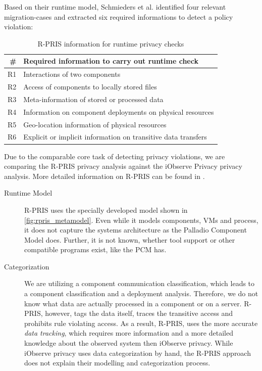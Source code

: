 Based on their runtime model, Schmieders et al. identified four relevant migration-cases and extracted six required informations to detect a policy violation\cite{Schmieders.2015}:

\begin{table}[h]
	\centering
	\begin{tabular}{r | l}
		\hline
		\textbf{\#} & \textbf{Required information to carry out runtime check}\\
		\hline
		R1 & Interactions of two components\\
		R2 & Access of components to locally stored files\\
		R3 & Meta-information of stored or processed data\\
		R4 & Information on component deployments on physical resources \\
		R5 & Geo-location information of physical resources\\
		R6 & Explicit or implicit information on transitive data transfers\\
		\hline
	\end{tabular}
	\caption{R-PRIS information for runtime privacy checks \cite{Schmieders.2015}}
	\label{tab:rpris_information}
\end{table}


Due to the comparable core task of detecting privacy violations, we are comparing the R-PRIS privacy analysis against the iObserve Privacy privacy analysis. More detailed information on R-PRIS can be found in \cite{Schmieders.}\cite{Schmieders.2015}.

\begin{description}
	\item[Runtime Model] R-PRIS uses the specially developed model shown in \autoref{fig:rpris_metamodel}. Even while it models components, VMs and process, it does not capture the systems architecture as the Palladio Component Model does. Further, it is not known, whether tool support or other compatible programs exist, like the PCM has. 
\end{description}

\begin{description}
	\item[Categorization] We are utilizing a component communication classification, which leads to a component classification and a deployment analysis. Therefore, we do not know what data are actually processed in a component or on a server. R-PRIS, however, tags the data itself, traces the transitive access and prohibits rule violating access. As a result, R-PRIS, uses the more accurate \textit{data tracking}, which requires more information and a more detailed knowledge about the observed system then iObserve privacy. While iObserve privacy uses data categorization by hand, the R-PRIS approach does not explain their modelling and categorization process.
\end{description}

